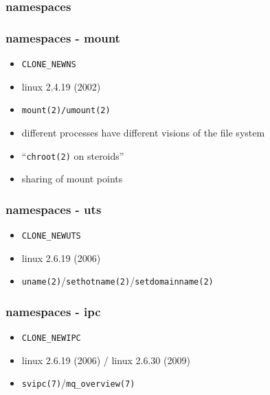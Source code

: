 \documentclass{beamer}
\begin{document}
\begin{frame}
    \frametitle{namespaces}
    \begin{itemize}
    \end{itemize}
\end{frame}

\begin{frame}
    \frametitle{namespaces - mount}
    \begin{itemize}
        \item \texttt{CLONE\_NEWNS}
        \item linux 2.4.19 (2002)
        \item \texttt{mount(2)/umount(2)}
        \item different processes have different visions of the file system
        \item ``\texttt{chroot(2)} on steroids''
        \item sharing of mount points
    \end{itemize}
\end{frame}

\begin{frame}
    \frametitle{namespaces - uts}
    \begin{itemize}
        \item \texttt{CLONE\_NEWUTS}
        \item linux 2.6.19 (2006)
        \item \texttt{uname(2)}/\texttt{sethotname(2)}/\texttt{setdomainname(2)}
    \end{itemize}
\end{frame}

\begin{frame}
    \frametitle{namespaces - ipc}
    \begin{itemize}
        \item \texttt{CLONE\_NEWIPC}
        \item linux 2.6.19 (2006) / linux 2.6.30 (2009)
        \item \texttt{svipc(7)}/\texttt{mq\_overview(7)}
    \end{itemize}
\end{frame}
\end{document}
